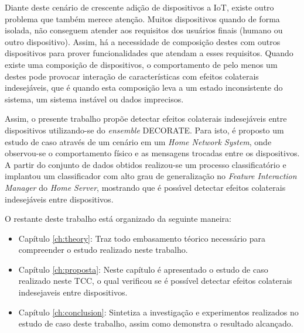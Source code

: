 Diante deste cenário de crescente adição de dispositivos a IoT, existe outro problema que também merece atenção. Muitos dispositivos quando de forma isolada, não conseguem atender aos requisitos dos usuários finais (humano ou outro dispositivo). Assim, há a necessidade de composição destes com outros dispositivos para prover funcionalidades que atendam a esses requisitos. Quando existe uma composição de dispositivos, o comportamento de pelo menos um destes pode provocar interação de características com efeitos colaterais indesejáveis, que é quando esta composição leva a um estado inconsistente do sistema, um sistema instável ou dados imprecisos. 

Assim, o presente trabalho propõe detectar efeitos colaterais indesejáveis entre dispositivos utilizando-se do \textit{ensemble} DECORATE. Para isto, é proposto um estudo de caso através de um cenário em um \textit{Home Network System}, onde observou-se o comportamento físico e as mensagens trocadas entre os dispositivos. A partir do conjunto de dados obtidos realizou-se um processo classificatório e implantou um classificador com alto grau de generalização no \textit{Feature Interaction Manager} do \textit{Home Server}, mostrando que é possı́vel detectar efeitos colaterais indesejáveis entre dispositivos.

O restante deste trabalho está organizado da seguinte maneira:

\begin{itemize}
\item Capítulo \ref{ch:theory}: Traz todo embasamento téorico necessário para compreender o estudo realizado neste trabalho.
\item Capítulo \ref{ch:proposta}: Neste capítulo é apresentado o estudo de caso realizado neste TCC, o qual verificou se é possível detectar efeitos colaterais indesejaveis entre dispositivos. 
\item Capítulo \ref{ch:conclusion}: Sintetiza a investigação e experimentos realizados no estudo de caso deste trabalho, assim como demonstra o resultado alcançado.
\end{itemize}

